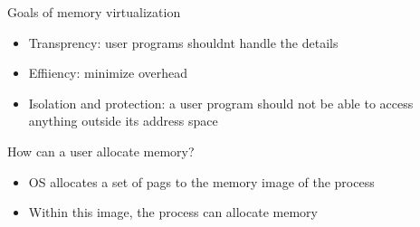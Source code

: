 \documentclass[12pt]{article}
\begin{document}
Goals of memory virtualization
\begin{itemize}
    \item Transprency: user programs shouldnt handle the details
    \item Effiiency: minimize overhead
    \item Isolation and protection: a user program should not be able to access anything outside its address space
\end{itemize}

How can a user allocate memory?
\begin{itemize}
    \item OS allocates a set of pags to the memory image of the process
    \item Within this image, the process can allocate memory
\end{itemize}
\end{document}
